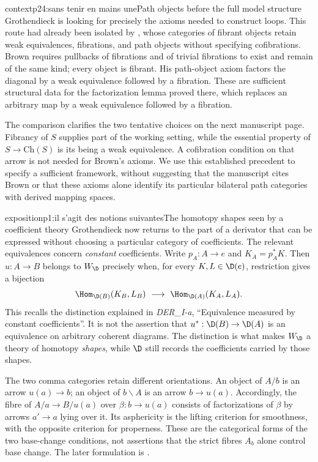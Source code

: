 \begin{dcomment}{context}{p24:sans tenir en mains une}{Path objects before the full model structure}
Grothendieck is looking for precisely the axioms needed to construct loops. This route had already been isolated by \citet[\S1, pp.~420--421]{Brown1973}, whose categories of fibrant objects retain weak equivalences, fibrations, and path objects without specifying cofibrations. Brown requires pullbacks of fibrations and of trivial fibrations to exist and remain of the same kind; every object is fibrant. His path-object axiom factors the diagonal by a weak equivalence followed by a fibration. These are sufficient structural data for the factorization lemma proved there, which replaces an arbitrary map by a weak equivalence followed by a fibration.

The comparison clarifies the two tentative choices on the next manuscript page. Fibrancy of $S$ supplies part of the working setting, while the essential property of $S\to\mathrm{Ch}(S)$ is its being a weak equivalence. A cofibration condition on that arrow is not needed for Brown's axioms. We use this established precedent to specify a sufficient framework, without suggesting that the manuscript cites Brown or that these axioms alone identify its particular bilateral path categories with derived mapping spaces.
\end{dcomment}




\begin{dcomment}{exposition}{p1:il s’agit des notions suivantes}{The homotopy shapes seen by a coefficient theory}
Grothendieck now returns to the part of a derivator that can be expressed without choosing a particular category of coefficients. The relevant equivalences concern \emph{constant} coefficients. Write $p_A:A\to e$ and $K_A=p_A^*K$. Then $u:A\to B$ belongs to $W_{\D}$ precisely when, for every $K,L\in\D(e)$, restriction gives a bijection
\[
 \Hom_{\D(B)}(K_B,L_B)\ \longrightarrow\
 \Hom_{\D(A)}(K_A,L_A).
\]
This recalls the distinction explained in \emph{DER\_I-a}, ``Equivalence measured by constant coefficients''. It is not the assertion that $u^*:\D(B)\to\D(A)$ is an equivalence on arbitrary coherent diagrams. The distinction is what makes $W_{\D}$ a theory of homotopy \emph{shapes}, while $\D$ still records the coefficients carried by those shapes.

The two comma categories retain different orientations. An object of $A/b$ is an arrow $u(a)\to b$; an object of $b\backslash A$ is an arrow $b\to u(a)$. Accordingly, the fibre of $A/a\to B/u(a)$ over $\beta:b\to u(a)$ consists of factorizations of $\beta$ by arrows $a'\to a$ lying over it. Its asphericity is the lifting criterion for smoothness, with the opposite criterion for properness. These are the categorical forms of the two base-change conditions, not assertions that the strict fibres $A_b$ alone control base change. The later formulation is \citet[Theorem~1.2 and its dual]{Maltsiniotis2005Asphericite}.
\end{dcomment}


